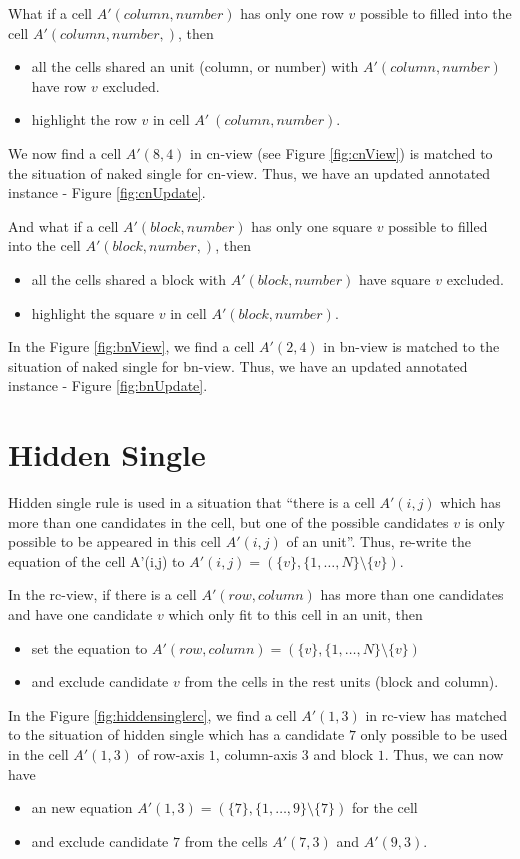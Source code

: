 \documentclass[11pt]{report}
\newcommand{\set}[1]{\{ #1 \}}
\begin{document}
What if a cell $A'(column, number)$ has only one row $v$ possible to filled into the cell $A'(column, number,)$, then
\begin{itemize}
\item all the cells shared an unit (column, or number) with $A'(column, number)$ have row $v$ excluded.
\item highlight the row $v$ in cell $A'\ (column, number)$.
\end{itemize}
We now find a cell $A'(8, 4)$ in cn-view (see Figure \ref{fig:cnView}) is matched to the situation of naked single for cn-view. Thus, we have an updated annotated instance - Figure \ref{fig:cnUpdate}.

And what if a cell $A'(block, number)$ has only one square $v$ possible to filled into the cell $A'(block, number,)$, then
\begin{itemize}
\item all the cells shared a block with $A'(block, number)$ have square $v$ excluded.
\item highlight the square $v$ in cell $A'(block, number)$.
\end{itemize}
In the Figure \ref{fig:bnView}, we find a cell $A'(2, 4)$ in bn-view is matched to the situation of naked single for bn-view. Thus, we have an updated annotated instance - Figure \ref{fig:bnUpdate}.


\section{Hidden Single}
\label{sec:Hidden Single}

Hidden single rule is used in a situation that ``there is a cell $A'(i,j)$ which has more than one candidates in the cell, but one of the possible candidates $v$ is only possible to be appeared in this cell $A'(i,j)$ of an unit''. Thus, re-write the equation of the cell A'(i,j) to $A'(i,j) =(\set{v}, \set{1,\dots,N} \setminus \set{v})$.

In the rc-view, if there is a cell $A'(row, column)$ has more than one candidates and have one candidate $v$ which only fit to this cell in an unit, then
\begin{itemize}
\item set the equation to $A'(row, column) =(\set{v}, \set{1,\dots,N} \setminus \set{v})$
\item and exclude candidate $v$ from the cells in the rest units (block and column).
\end{itemize}
In the Figure \ref{fig:hiddensinglerc}, we find a cell $A'(1, 3)$ in rc-view has matched to the situation of hidden single which has a candidate $7$ only possible to be used in the cell $A'(1, 3)$ of row-axis $1$, column-axis $3$ and block $1$. Thus, we can now have 
\begin{itemize}
\item an new equation $A'(1, 3) =(\set{7}, \set{1,\dots,9} \setminus \set{7})$ for the cell
\item and exclude candidate $7$ from the cells $A'(7, 3)$ and $A'(9, 3)$.
\end{itemize}
\end{document}
